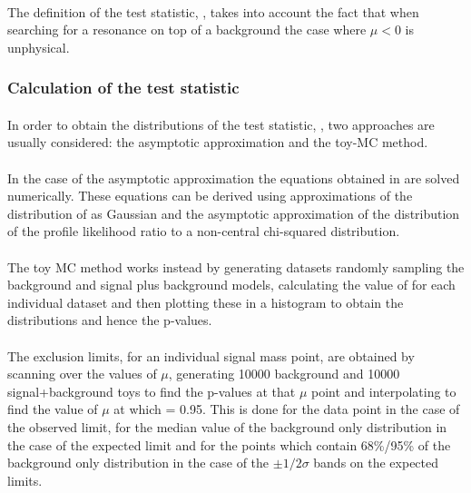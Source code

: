 \paragraph{}
The definition of the test statistic, \qmutilde, takes into account the fact that when searching 
for a resonance on top of a background the case where $\mu < 0$ is unphysical.

\subsubsection{Calculation of the test statistic}

\paragraph{}
In order to obtain the distributions of the test statistic, \qmutilde, two approaches are usually considered: the asymptotic approximation and the toy-MC method.

\paragraph{}
In the case of the asymptotic approximation the equations obtained in \cite{AsymLikelihood} are solved numerically. These equations can be derived using approximations  of the distribution of \muhat as Gaussian and the asymptotic approximation of the distribution of the profile likelihood ratio to a non-central chi-squared distribution. 

\paragraph{}
The toy MC method works instead by generating datasets randomly sampling the background and signal plus background models, calculating the value of \qmutilde for each individual dataset and then plotting these in a histogram to obtain the distributions and hence the p-values.

\paragraph{}
The exclusion limits, for an individual signal mass point, are obtained by scanning over the values of $\mu$, generating 10000 background and 10000 signal+background toys to find the p-values at that $\mu$ point and interpolating to find the value of $\mu$ at which \cls = 0.95. This is done for the data point in the case of the observed limit, for the median value of the background only distribution in the case of the expected limit and for the points which contain 68\%/95\% of the background only distribution in the case of the $\pm 1/2\sigma$ bands on the expected limits. 

